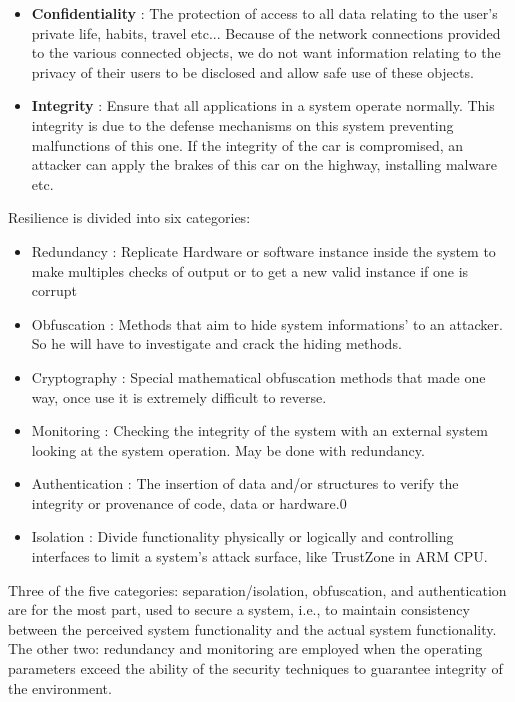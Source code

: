 \begin{itemize}
\item \textbf{Confidentiality} : The protection of access to all data relating
to the user's private life, habits, travel etc... Because of the
network connections provided to the various connected objects, we do
not want information relating to the privacy of their users to be
disclosed and allow safe use of these objects.

\item \textbf{Integrity} : Ensure that all applications in a system operate
normally. This integrity is due to the defense mechanisms on this
system preventing malfunctions of this one.  If the integrity of the
car is compromised, an attacker can apply the brakes of this car on
the highway, installing malware etc.


\end{itemize}

\bigskip

Resilience is divided into six categories: 

\begin{itemize}

\item Redundancy : Replicate Hardware or software instance inside the
  system to make multiples checks of output or to get a new valid
  instance if one is corrupt

\item Obfuscation : Methods that aim to hide system informations' to an
  attacker. So he will have to investigate and crack the hiding
  methods.

\item Cryptography : Special mathematical obfuscation methods that made
  one way, once use it is extremely difficult to reverse.

\item Monitoring : Checking the integrity of the system with an external
  system looking at the system operation. May be done with redundancy.

\item Authentication : The insertion of data and/or structures to verify
   the integrity or provenance of code, data or hardware.0

\item Isolation : Divide functionality physically or logically and
 controlling interfaces to limit a system’s attack surface, like
 TrustZone in ARM CPU.
 
\end{itemize}
 
Three of the five categories: separation/isolation, obfuscation, and
authentication are for the most part, used to secure a system, i.e.,
to maintain consistency between the perceived system functionality and
the actual system functionality. The other two: redundancy and
monitoring are employed when the operating parameters exceed the
ability of the security techniques to guarantee integrity of the
environment.

